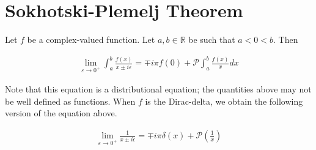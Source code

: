 \documentclass[book.tex]{subfiles}
\begin{document}
\section{Sokhotski-Plemelj Theorem}

Let $f$ be a complex-valued function. Let $a, b \in \mathbb{R}$ be such that $a < 0 < b$. Then

\begin{align}
    \lim_{\varepsilon \to 0^+} \int_{a}^b \frac{f(x)}{x \pm i \varepsilon} = \mp i \pi f(0) + \mathcal{P} \int_a^b \frac{f(x)}{x} dx
\end{align}

Note that this equation is a distributional equation; the quantities above may not be well defined as functions. When $f$ is the Dirac-delta, we obtain the following version of the equation above. 

\begin{align}
    \lim_{\varepsilon \to 0^+} \frac{1}{x \pm i \epsilon} = \mp i \pi \delta(x) + \mathcal{P} \left ( \frac{1}{x} \right )
\end{align}


\end{document}
